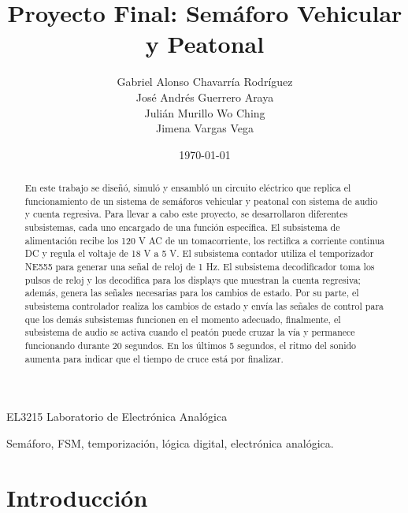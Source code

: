 \documentclass[12pt,onecolumn]{IEEEtran}
\title{Proyecto Final: Semáforo Vehicular y Peatonal}
\author{
Gabriel Alonso Chavarría Rodríguez\\
José Andrés Guerrero Araya\\
Julián Murillo Wo Ching\\
Jimena Vargas Vega
}
\date{\today}
\begin{document}
%
{EL3215 Laboratorio de Electrónica Analógica}

\maketitle

\begin{abstract}
En este trabajo se diseñó, simuló y ensambló un circuito eléctrico que replica el funcionamiento de un sistema de semáforos vehicular y peatonal con sistema de audio y cuenta regresiva. Para llevar a cabo este proyecto, se desarrollaron diferentes subsistemas, cada uno encargado de una función específica. El subsistema de alimentación recibe los 120 V AC de un tomacorriente, los rectifica a corriente continua DC y regula el voltaje de 18 V a 5 V. El subsistema contador utiliza el temporizador NE555 para generar una señal de reloj de 1 Hz. El subsistema decodificador toma los pulsos de reloj y los decodifica para los displays que muestran la cuenta regresiva; además, genera las señales necesarias para los cambios de estado. Por su parte, el subsistema controlador realiza los cambios de estado y envía las señales de control para que los demás subsistemas funcionen en el momento adecuado, finalmente, el subsistema de audio se activa cuando el peatón puede cruzar la vía y permanece funcionando durante 20 segundos. En los últimos 5 segundos, el ritmo del sonido aumenta para indicar que el tiempo de cruce está por finalizar.
\end{abstract}

\begin{IEEEkeywords}
Semáforo, FSM, temporización, lógica digital, electrónica analógica.
\end{IEEEkeywords}

\section{Introducción}
\end{document}
